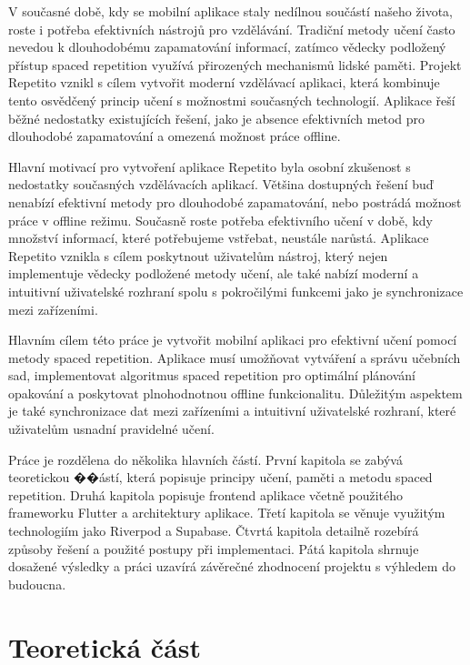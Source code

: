 \documentclass[12pt, a4paper, twoside, openright]{report}
\begin{document}
V současné době, kdy se mobilní aplikace staly nedílnou součástí našeho života, roste i potřeba efektivních nástrojů pro vzdělávání. Tradiční metody učení často nevedou k dlouhodobému zapamatování informací, zatímco vědecky podložený přístup spaced repetition využívá přirozených mechanismů lidské paměti. Projekt Repetito vznikl s cílem vytvořit moderní vzdělávací aplikaci, která kombinuje tento osvědčený princip učení s možnostmi současných technologií. Aplikace řeší běžné nedostatky existujících řešení, jako je absence efektivních metod pro dlouhodobé zapamatování a omezená možnost práce offline.

Hlavní motivací pro vytvoření aplikace Repetito byla osobní zkušenost s nedostatky současných vzdělávacích aplikací. Většina dostupných řešení buď nenabízí efektivní metody pro dlouhodobé zapamatování, nebo postrádá možnost práce v offline režimu. Současně roste potřeba efektivního učení v době, kdy množství informací, které potřebujeme vstřebat, neustále narůstá. Aplikace Repetito vznikla s cílem poskytnout uživatelům nástroj, který nejen implementuje vědecky podložené metody učení, ale také nabízí moderní a intuitivní uživatelské rozhraní spolu s pokročilými funkcemi jako je synchronizace mezi zařízeními.

Hlavním cílem této práce je vytvořit mobilní aplikaci pro efektivní učení pomocí metody spaced repetition. Aplikace musí umožňovat vytváření a správu učebních sad, implementovat algoritmus spaced repetition pro optimální plánování opakování a poskytovat plnohodnotnou offline funkcionalitu. Důležitým aspektem je také synchronizace dat mezi zařízeními a intuitivní uživatelské rozhraní, které uživatelům usnadní pravidelné učení.

Práce je rozdělena do několika hlavních částí. První kapitola se zabývá teoretickou ��ástí, která popisuje principy učení, paměti a metodu spaced repetition. Druhá kapitola popisuje frontend aplikace včetně použitého frameworku Flutter a architektury aplikace. Třetí kapitola se věnuje využitým technologiím jako Riverpod a Supabase. Čtvrtá kapitola detailně rozebírá způsoby řešení a použité postupy při implementaci. Pátá kapitola shrnuje dosažené výsledky a práci uzavírá závěrečné zhodnocení projektu s výhledem do budoucna.

\chapter{Teoretická část}
\end{document}
